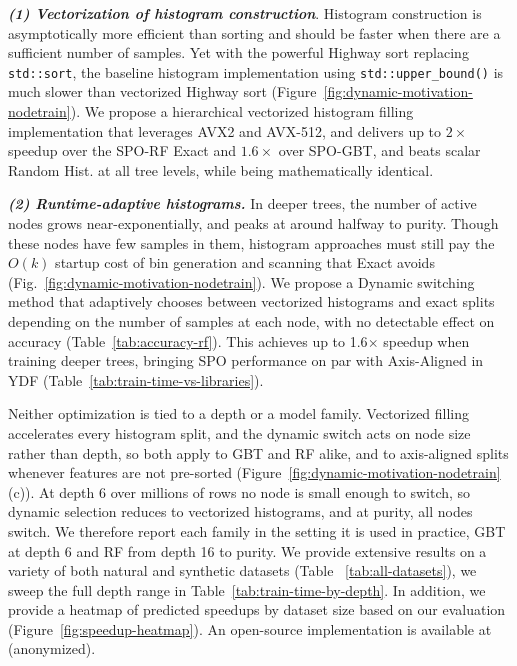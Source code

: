 \documentclass[sigconf]{acmart}%
\newcommand{\TODO}[1]{\textbf{\textcolor{red}{#1}}}
\begin{document}
\emph{\textbf{(1) Vectorization of histogram construction}}. Histogram construction is asymptotically more efficient than sorting and should be faster when there are a sufficient number of samples. Yet with the powerful Highway sort replacing \texttt{std::sort}, the baseline histogram implementation using \texttt{std::upper\_bound()} is much slower than vectorized Highway sort (Figure~\ref{fig:dynamic-motivation-nodetrain}). We propose a hierarchical vectorized histogram filling implementation that leverages AVX2 and AVX-512, and delivers up to $2\times$ speedup over the SPO-RF Exact and $1.6\times$ over SPO-GBT, and beats scalar Random Hist. at all tree levels, while being mathematically identical.

\emph{\textbf{(2) Runtime-adaptive histograms.}} In deeper trees, the number of active nodes grows near-exponentially, and peaks at around halfway to purity. Though these nodes have few samples in them, histogram approaches must still pay the $O(k)$ startup cost of bin generation and scanning that Exact avoids (Fig.~\ref{fig:dynamic-motivation-nodetrain}). We propose a Dynamic switching method that adaptively chooses between vectorized histograms and exact splits depending on the number of samples at each node, with no detectable effect on accuracy (Table~\ref{tab:accuracy-rf}). This achieves up to 1.6$\times$ speedup when training deeper trees, bringing SPO performance on par with Axis-Aligned in YDF (Table~\ref{tab:train-time-vs-libraries}).

Neither optimization is tied to a depth or a model family. Vectorized filling accelerates every histogram split, and the dynamic switch acts on node size rather than depth, so both apply to GBT and RF alike, and to axis-aligned splits whenever features are not pre-sorted (Figure~\ref{fig:dynamic-motivation-nodetrain}(c)). At depth 6 over millions of rows no node is small enough to switch, so dynamic selection reduces to vectorized histograms, and at purity, all nodes switch. We therefore report each family in the setting it is used in practice, GBT at depth 6 and RF from depth 16 to purity. We provide extensive results on a variety of both natural and synthetic datasets (Table ~\ref{tab:all-datasets}), we sweep the full depth range in Table~\ref{tab:train-time-by-depth}. In addition, we provide a heatmap of predicted speedups by dataset size based on our evaluation (Figure~\ref{fig:speedup-heatmap}). An open-source implementation is available at (anonymized).

\end{document}
